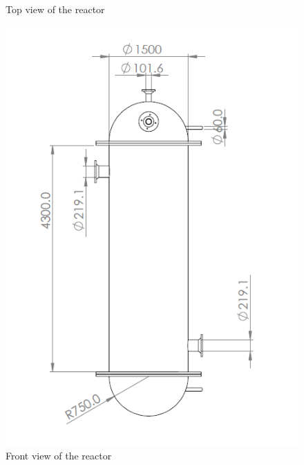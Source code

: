 \begin{figure}[h]
\begin{minipage}[t]{0.4\linewidth}
        \caption{Top view of the reactor}
        \label{fig:reactortop}
    \end{minipage}
\end{figure}
\begin{figure}
    \centering

\end{figure}

\begin{figure}[h]
    \begin{minipage}[t]{0.49\linewidth}
        \includegraphics[width=\linewidth]{chapters/2-reaction/figures/FYD reactor right view with calc.PNG}
        \caption{Front view of the reactor}
        \label{fig:reactorright}
    \end{minipage}\hfill
    \begin{minipage}[t]{0.49\linewidth}

\end{minipage}
\end{figure}
